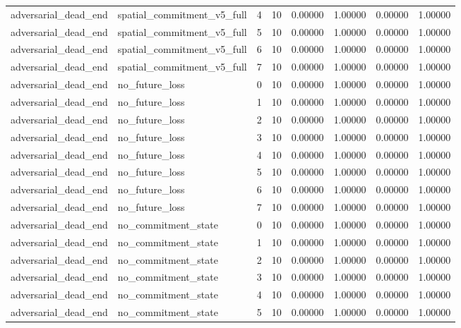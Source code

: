 \documentclass{article}
\begin{document}
\begin{table}[tbp]
{\begin{tabular}{llllllll}
adversarial\_dead\_end & spatial\_commitment\_v5\_full & 4 & 10 & 0.00000 & 1.00000 & 0.00000 & 1.00000 \\
adversarial\_dead\_end & spatial\_commitment\_v5\_full & 5 & 10 & 0.00000 & 1.00000 & 0.00000 & 1.00000 \\
adversarial\_dead\_end & spatial\_commitment\_v5\_full & 6 & 10 & 0.00000 & 1.00000 & 0.00000 & 1.00000 \\
adversarial\_dead\_end & spatial\_commitment\_v5\_full & 7 & 10 & 0.00000 & 1.00000 & 0.00000 & 1.00000 \\
adversarial\_dead\_end & no\_future\_loss & 0 & 10 & 0.00000 & 1.00000 & 0.00000 & 1.00000 \\
adversarial\_dead\_end & no\_future\_loss & 1 & 10 & 0.00000 & 1.00000 & 0.00000 & 1.00000 \\
adversarial\_dead\_end & no\_future\_loss & 2 & 10 & 0.00000 & 1.00000 & 0.00000 & 1.00000 \\
adversarial\_dead\_end & no\_future\_loss & 3 & 10 & 0.00000 & 1.00000 & 0.00000 & 1.00000 \\
adversarial\_dead\_end & no\_future\_loss & 4 & 10 & 0.00000 & 1.00000 & 0.00000 & 1.00000 \\
adversarial\_dead\_end & no\_future\_loss & 5 & 10 & 0.00000 & 1.00000 & 0.00000 & 1.00000 \\
adversarial\_dead\_end & no\_future\_loss & 6 & 10 & 0.00000 & 1.00000 & 0.00000 & 1.00000 \\
adversarial\_dead\_end & no\_future\_loss & 7 & 10 & 0.00000 & 1.00000 & 0.00000 & 1.00000 \\
adversarial\_dead\_end & no\_commitment\_state & 0 & 10 & 0.00000 & 1.00000 & 0.00000 & 1.00000 \\
adversarial\_dead\_end & no\_commitment\_state & 1 & 10 & 0.00000 & 1.00000 & 0.00000 & 1.00000 \\
adversarial\_dead\_end & no\_commitment\_state & 2 & 10 & 0.00000 & 1.00000 & 0.00000 & 1.00000 \\
adversarial\_dead\_end & no\_commitment\_state & 3 & 10 & 0.00000 & 1.00000 & 0.00000 & 1.00000 \\
adversarial\_dead\_end & no\_commitment\_state & 4 & 10 & 0.00000 & 1.00000 & 0.00000 & 1.00000 \\
adversarial\_dead\_end & no\_commitment\_state & 5 & 10 & 0.00000 & 1.00000 & 0.00000 & 1.00000 \\
\bottomrule
\end{tabular}
}
\end{table}
\end{document}
